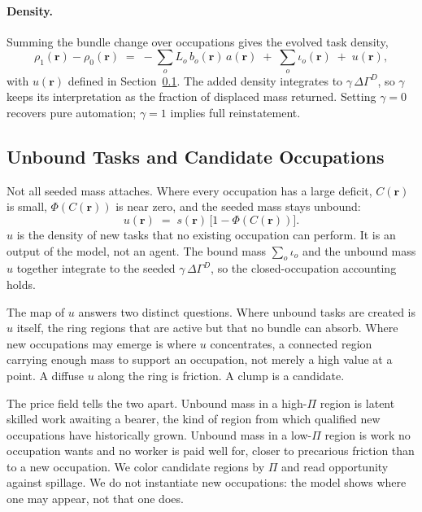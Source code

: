 \documentclass[12pt, a4paper]{article}
\begin{document}
\paragraph{Density.}
Summing the bundle change over occupations gives the evolved task
density,
\begin{equation}
  \rho_1(\mathbf{r}) - \rho_0(\mathbf{r})
  \;=\;
  -\sum_o L_o\, b_o(\mathbf{r})\, a(\mathbf{r})
  \;+\;
  \sum_o \iota_o(\mathbf{r})
  \;+\;
  u(\mathbf{r}),
  \label{eq:rho-evolution}
\end{equation}
with $u(\mathbf{r})$ defined in Section~\ref{sec:unbound}. The added
density integrates to $\gamma\,\Delta\Gamma^D$, so $\gamma$ keeps its
interpretation as the fraction of displaced mass returned. Setting
$\gamma = 0$ recovers pure automation; $\gamma = 1$ implies full
reinstatement.

\subsection{Unbound Tasks and Candidate Occupations}
\label{sec:unbound}

Not all seeded mass attaches. Where every occupation has a large
deficit, $C(\mathbf{r})$ is small, $\Phi(C(\mathbf{r}))$ is near zero,
and the seeded mass stays unbound:
\begin{equation}
  u(\mathbf{r})
  \;=\;
  s(\mathbf{r})\,\bigl[1 - \Phi(C(\mathbf{r}))\bigr].
  \label{eq:unbound}
\end{equation}
$u$ is the density of new tasks that no existing occupation can perform.
It is an output of the model, not an agent. The bound mass
$\sum_o \iota_o$ and the unbound mass $u$ together integrate to the
seeded $\gamma\,\Delta\Gamma^D$, so the closed-occupation accounting
holds.

The map of $u$ answers two distinct questions. Where unbound tasks are
created is $u$ itself, the ring regions that are active but that no
bundle can absorb. Where new occupations may emerge is where $u$
concentrates, a connected region carrying enough mass to support an
occupation, not merely a high value at a point. A diffuse $u$ along the
ring is friction. A clump is a candidate.

The price field tells the two apart. Unbound mass in a high-$\Pi$ region
is latent skilled work awaiting a bearer, the kind of region from which
qualified new occupations have historically grown. Unbound mass in a
low-$\Pi$ region is work no occupation wants and no worker is paid well
for, closer to precarious friction than to a new occupation. We color
candidate regions by $\Pi$ and read opportunity against spillage. We do
not instantiate new occupations: the model shows where one may appear,
not that one does.
\end{document}
